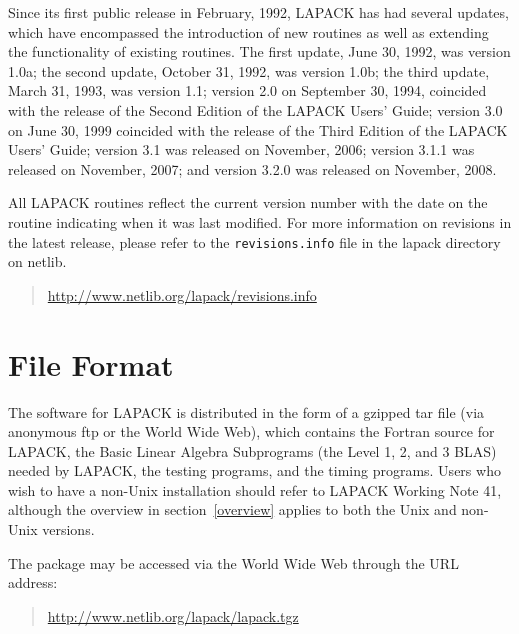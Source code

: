 \documentclass[11pt]{report}
\begin{document}
Since its first public release in February, 1992, LAPACK has had
several updates, which have encompassed the introduction of new routines
as well as extending the functionality of existing routines.  The first
update,
June 30, 1992, was version 1.0a; the second update, October 31, 1992,
was version 1.0b; the third update, March 31, 1993, was version 1.1;
version 2.0 on September 30, 1994, coincided with the release of the
Second Edition of the LAPACK Users' Guide; 
version 3.0 on June 30, 1999 coincided with the release of the Third Edition of
the LAPACK Users' Guide; 
version 3.1 was released on November, 2006;
version 3.1.1 was released on November, 2007;
and version 3.2.0 was released on November, 2008.

All LAPACK routines reflect the current version number with the date
on the routine indicating when it was last modified.
For more information on revisions in the latest release, please refer
to the \texttt{revisions.info} file in the lapack directory on netlib.
\begin{quote}
\url{http://www.netlib.org/lapack/revisions.info}
\end{quote}

%

\section{File Format}\label{fileformat}

The software for LAPACK is distributed in the form of a
gzipped tar file (via anonymous ftp or the World Wide Web),
which contains the Fortran source for LAPACK,
the Basic Linear Algebra Subprograms
(the Level 1, 2, and 3 BLAS) needed by LAPACK, the testing programs,
and the timing programs\footnotemark[\value{footnote}]. 
Users who wish to have a non-Unix installation should refer to LAPACK
Working Note 41,
although the overview in section~\ref{overview} applies to both the Unix and non-Unix
versions.

The package may be accessed via the World Wide Web through
the URL address:
\begin{quote}
\url{http://www.netlib.org/lapack/lapack.tgz}
\end{quote}
\end{document}
